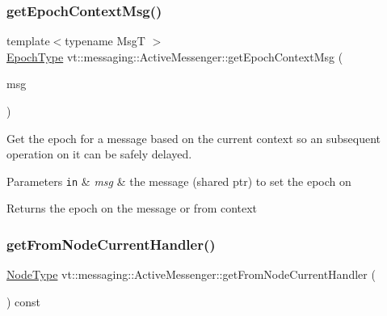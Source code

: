 \subsubsection{\texorpdfstring{get\+Epoch\+Context\+Msg()}{getEpochContextMsg()}\hspace{0.1cm}{\footnotesize\ttfamily [2/2]}}
{\footnotesize\ttfamily template$<$typename MsgT $>$ \\
\hyperlink{namespacevt_a985a5adf291c34a3ca263b3378388236}{Epoch\+Type} vt\+::messaging\+::\+Active\+Messenger\+::get\+Epoch\+Context\+Msg (\begin{DoxyParamCaption}\item[{\hyperlink{structvt_1_1messaging_1_1_msg_shared_ptr}{Msg\+Shared\+Ptr}$<$ MsgT $>$ const \&}]{msg }\end{DoxyParamCaption})\hspace{0.3cm}{\ttfamily [inline]}}



Get the epoch for a message based on the current context so an subsequent operation on it can be safely delayed. 


\begin{DoxyParams}[1]{Parameters}
\mbox{\tt in}  & {\em msg} & the message (shared ptr) to set the epoch on\\
\hline
\end{DoxyParams}
\begin{DoxyReturn}{Returns}
the epoch on the message or from context 
\end{DoxyReturn}
\mbox{\label{structvt_1_1messaging_1_1_active_messenger_a433c49a43b304429aa2e046733dc8fde}} 
\subsubsection{\texorpdfstring{get\+From\+Node\+Current\+Handler()}{getFromNodeCurrentHandler()}}
{\footnotesize\ttfamily \hyperlink{namespacevt_a866da9d0efc19c0a1ce79e9e492f47e2}{Node\+Type} vt\+::messaging\+::\+Active\+Messenger\+::get\+From\+Node\+Current\+Handler (\begin{DoxyParamCaption}{ }\end{DoxyParamCaption}) const}



